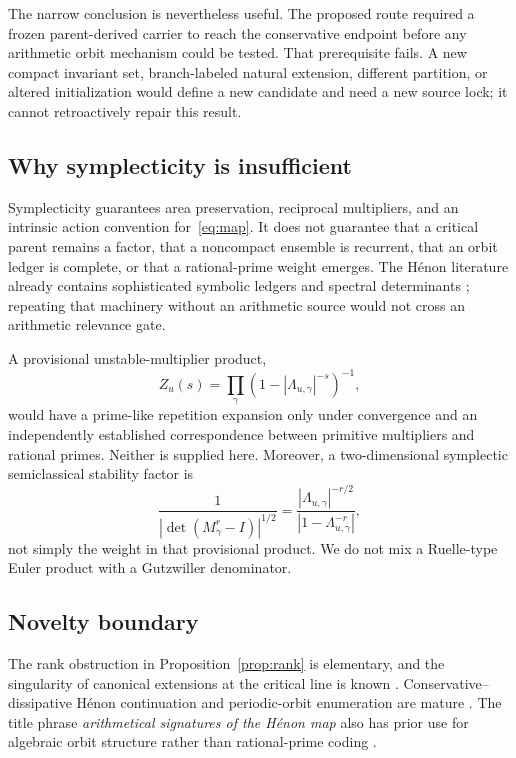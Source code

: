 \documentclass[11pt]{article}
\begin{document}
The narrow conclusion is nevertheless useful. The proposed route required a
frozen parent-derived carrier to reach the conservative endpoint before any
arithmetic orbit mechanism could be tested. That prerequisite fails. A new
compact invariant set, branch-labeled natural extension, different partition,
or altered initialization would define a new candidate and need a new source
lock; it cannot retroactively repair this result.

\subsection{Why symplecticity is insufficient}

Symplecticity guarantees area preservation, reciprocal multipliers, and an
intrinsic action convention for~\eqref{eq:map}. It does not guarantee that a
critical parent remains a factor, that a noncompact ensemble is recurrent,
that an orbit ledger is complete, or that a rational-prime weight emerges.
The H\'enon literature already contains sophisticated symbolic ledgers and
spectral determinants
\citep{gallas2007counting,sattari2017transport,rugh1996fredholm}; repeating
that machinery without an arithmetic source would not cross an arithmetic
relevance gate.

A provisional unstable-multiplier product,
\[
Z_u(s)=\prod_\gamma
\left(1-|\Lambda_{u,\gamma}|^{-s}\right)^{-1},
\]
would have a prime-like repetition expansion only under convergence and an
independently established correspondence between primitive multipliers and
rational primes. Neither is supplied here. Moreover, a two-dimensional
symplectic semiclassical stability factor is
\[
\frac{1}{|\det(M_\gamma^r-I)|^{1/2}}
=\frac{|\Lambda_{u,\gamma}|^{-r/2}}
{|1-\Lambda_{u,\gamma}^{-r}|},
\]
not simply the weight in that provisional product. We do not mix a
Ruelle-type Euler product with a Gutzwiller denominator.

\subsection{Novelty boundary}

The rank obstruction in Proposition~\ref{prop:rank} is elementary, and the
singularity of canonical extensions at the critical line is known
\citep{fogedby2005weak,demaeyer2009escape}. Conservative--dissipative
H\'enon continuation and periodic-orbit enumeration are mature
\citep{heagy1992physical,sterling1998antiintegrable,
arai2025antiintegrability,gallas2007counting,sattari2017transport}.
The title phrase \emph{arithmetical signatures of the H\'enon map} also has
prior use for algebraic orbit structure rather than rational-prime coding
\citep{endler2002arithmetical}.
\end{document}

